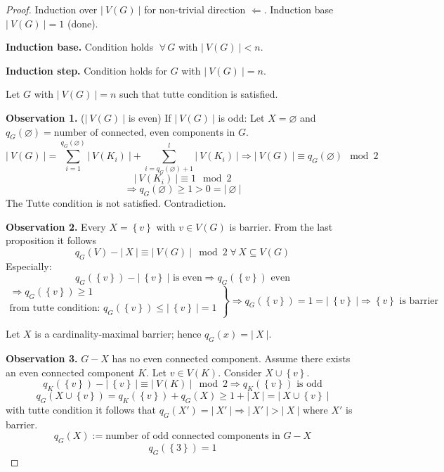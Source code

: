 \documentclass{article}
\newcommand{\card}[1]{\left|\:\!#1\:\!\right|}
\newcommand{\set}[1]{\left\{#1\right\}}
\newcommand{\fall}{\;\forall\,}
\begin{document}
\begin{proof}
  Induction over $\card{V(G)}$ for non-trivial direction $\Leftarrow$.
  Induction base $\card{V(G)} = 1$ (done).

  \textbf{Induction base.}
    Condition holds $\fall G$ with $\card{V(G)} < n$.

  \textbf{Induction step.}
    Condition holds for $G$ with $\card{V(G)} = n$.

  Let $G$ with $\card{V(G)} = n$ such that tutte condition is satisfied.

  \textbf{Observation 1.} ($\card{V(G)}$ is even)
    If $\card{V(G)}$ is odd:
    Let $X = \diameter$ and $q_G(\diameter) = \text{number of connected, even components in } G$.
    \[
      \card{V(G)} = \sum_{i=1}^{q_G(\diameter)} \card{V(K_i)}
        + \sum_{i=q_G(\diameter)+1}^l \card{V(K_i)}
        \Rightarrow \card{V(G)} \equiv q_G(\diameter) \mod{2}
    \] \[
      \card{V(K_i)} \equiv 1 \mod{2}
    \] \[
      \Rightarrow q_G(\diameter) \geq 1 > 0 = \card{\diameter}
    \]
    The Tutte condition is not satisfied. Contradiction.

  \textbf{Observation 2.} Every $X = \set{v}$ with $v \in V(G)$ is barrier.
    From the last proposition it follows
    \[ q_G(V) - \card{X} \equiv \card{V(G)} \mod{2} \fall X \subseteq V(G) \]
    Especially:
    \[ q_G(\set{v}) - \card{\set{v}} \text{ is even} \Rightarrow q_G(\set{v}) \text{ even} \]
    \[
      \left.\begin{array}{c}
        \Rightarrow q_G(\set{v}) \geq 1 \\
        \text{from tutte condition: } q_G(\set{v}) \leq \card{\set{v}} = 1
      \end{array}\right\}
      \Rightarrow q_G(\set{v}) = 1 = \card{\set{v}} \Rightarrow \set{v} \text{ is barrier}
    \]

  Let $X$ is a cardinality-maximal barrier; hence $q_G(x) = \card{X}$.

  \textbf{Observation 3.}
    $G-X$ has no even connected component.
    Assume there exists an even connected component $K$. Let $v \in V(K)$. Consider $X \cup \set{v}$.
    \[
      q_K(\set{v}) - \card{\set{v}} \equiv \card{V(K)} \mod{2}
      \Rightarrow q_K(\set{v}) \text{ is odd}
    \] \[
      q_G(X \cup \set{v}) = q_K(\set{v}) + q_G(X) \geq 1 + \card{X} = \card{X \cup \set{v}}
    \]
    with tutte condition it follows that $q_G(X') = \card{X'} \Rightarrow \card{X'} > \card{X}$
    where $X'$ is barrier.
    \[ q_G(X) := \text{number of odd connected components in $G-X$} \]
    \[ q_G(\set{3}) = 1 \]


\end{proof}
\end{document}
